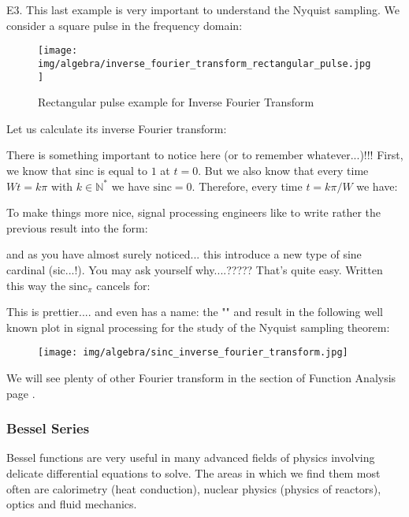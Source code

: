 	\pagebreak
	\begin{tcolorbox}[colframe=black,colback=white,sharp corners]
	E3.\label{inverse fourier transform square pulse} This last example is very important to understand the Nyquist sampling. We consider a square pulse in the frequency domain:
	\begin{figure}[H]
		\centering
		\texttt{[image: img/algebra/inverse\_fourier\_transform\_rectangular\_pulse.jpg]}
		\caption{Rectangular pulse example for Inverse Fourier Transform}
	\end{figure}
	Let us calculate its inverse Fourier transform:
	
	There is something important to notice here (or to remember whatever...)!!! First, we know that sinc is equal to $1$ at $t=0$. But we also know that every time $Wt=k\pi$ with $k\in\mathbb{N}^{*}$ we have $\mathrm{sinc}=0$. Therefore, every time $t=k\pi/W$ we have:
	
	To make things more nice, signal processing engineers like to write rather the previous result into the form:
	
	and as you have almost surely noticed... this introduce a new type of sine cardinal (sic...!).  You may ask yourself why....????? That's quite easy. Written this way the $\mathrm{sinc}_\pi$ cancels for:
	
	This is prettier.... and even has a name: the "" and result in the following well known plot in signal processing for the study of the Nyquist sampling theorem:
	\end{tcolorbox}
	\begin{tcolorbox}[colframe=black,colback=white,sharp corners]
	\begin{figure}[H]
		\centering
		\texttt{[image: img/algebra/sinc\_inverse\_fourier\_transform.jpg]}
	\end{figure}
	\end{tcolorbox}
	We will see plenty of other Fourier transform in the section of Function Analysis page \pageref{usual Fourier transforms}.
	
	\pagebreak
	\subsubsection{Bessel Series}
	Bessel functions are very useful in many advanced fields of physics involving delicate differential equations to solve. The areas in which we find them most often are calorimetry (heat conduction), nuclear physics (physics of reactors), optics and fluid mechanics.
	
